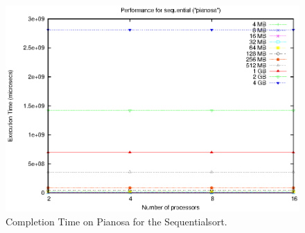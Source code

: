 \begin{figure}[!ht]
	\begin{center}
		\includegraphics[scale=0.6]{plots/test_01_pianosa/NxTxM/sequential_pianosa_NxTxM}
	\end{center}
  	\caption{Completion Time on Pianosa for the Sequentialsort.}
  	\label{sequential-pianosa}
\end{figure}

